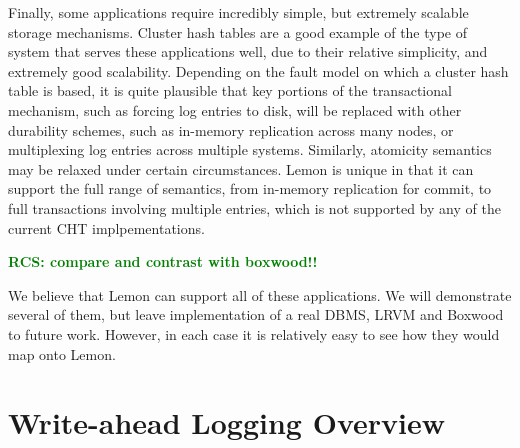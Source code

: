 \documentclass[letterpaper,twocolumn,english]{article}
\newcommand{\yad}{Lemon\xspace}
\newcommand{\rcs}[1]{\textcolor{green}{\bf RCS: #1}}
\begin{document}

Finally, some applications require incredibly simple, but extremely
scalable storage mechanisms.  Cluster hash tables are a good example
of the type of system that serves these applications well, due to
their relative simplicity, and extremely good scalability.  Depending
on the fault model on which a cluster hash table is based, it is
quite plausible that key portions of the transactional mechanism, such
as forcing log entries to disk, will be replaced with other durability
schemes, such as in-memory replication across many nodes, or
multiplexing log entries across multiple systems.  Similarly,
atomicity semantics may be relaxed under certain circumstances.  \yad is unique in that it can support the full range of semantics, from in-memory replication for commit, to full transactions involving multiple entries, which is not supported by any of the current CHT implpementations.

\rcs{compare and contrast with boxwood!!}


We believe that \yad can support all of these
applications. We will demonstrate several of them, but leave
implementation of a real DBMS, LRVM and Boxwood to future work.
However, in each case it is relatively easy to see how they would map
onto \yad.


%


\section{Write-ahead Logging Overview}
\end{document}
